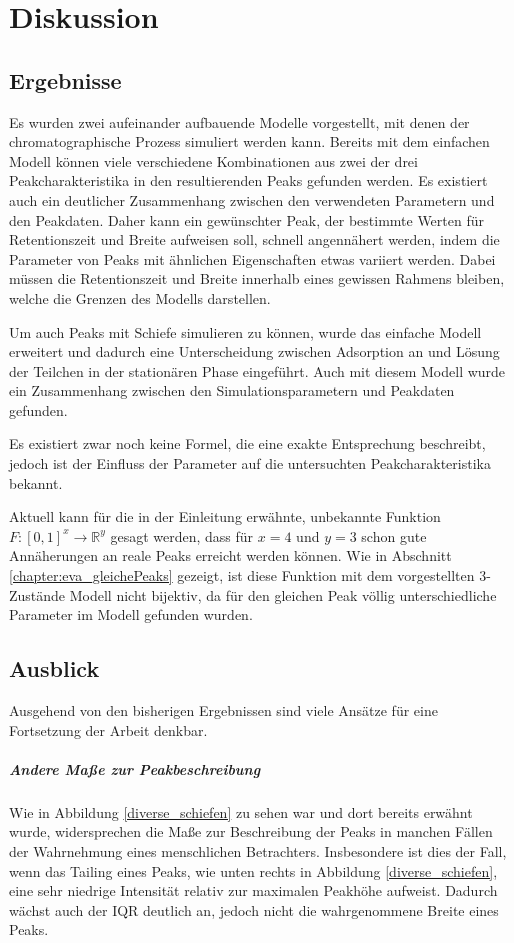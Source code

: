 \chapter{Diskussion}
\label{chapter:dis}

\section{Ergebnisse}
Es wurden zwei aufeinander aufbauende Modelle vorgestellt, mit denen der chromatographische Prozess simuliert werden kann. Bereits mit dem einfachen Modell können viele verschiedene Kombinationen aus zwei der drei Peakcharakteristika in den resultierenden Peaks gefunden werden. Es existiert auch ein deutlicher Zusammenhang zwischen den verwendeten Parametern und den Peakdaten. Daher kann ein gewünschter Peak, der bestimmte Werten für Retentionszeit und Breite aufweisen soll, schnell angennähert werden, indem die Parameter von Peaks mit ähnlichen Eigenschaften etwas variiert werden. Dabei müssen die Retentionszeit und Breite innerhalb eines gewissen Rahmens bleiben, welche die Grenzen des Modells darstellen.

Um auch Peaks mit Schiefe simulieren zu können, wurde das einfache Modell erweitert und dadurch eine Unterscheidung zwischen Adsorption an und Lösung der Teilchen in der stationären Phase eingeführt. Auch mit diesem Modell wurde ein Zusammenhang zwischen den Simulationsparametern und Peakdaten gefunden. 

Es existiert zwar noch keine Formel, die eine exakte Entsprechung beschreibt, jedoch ist der Einfluss der Parameter auf die untersuchten Peakcharakteristika bekannt. 

Aktuell kann für die in der Einleitung erwähnte, unbekannte Funktion  $F: [0,1] ^ x \rightarrow \mathbb{R}^y$ gesagt werden, dass für $x = 4$ und $y = 3$ schon gute Annäherungen an reale Peaks erreicht werden können.
Wie in Abschnitt \ref{chapter:eva_gleichePeaks} gezeigt, ist diese Funktion mit dem vorgestellten 3-Zustände Modell nicht bijektiv, da für den gleichen Peak völlig unterschiedliche Parameter im Modell gefunden wurden.


\section{Ausblick}
Ausgehend von den bisherigen Ergebnissen sind viele Ansätze für eine Fortsetzung der Arbeit denkbar.

\paragraph{Andere Maße zur Peakbeschreibung}
Wie in Abbildung \ref{diverse_schiefen} zu sehen war und dort bereits erwähnt wurde, widersprechen die Maße zur Beschreibung der Peaks in manchen Fällen der Wahrnehmung eines menschlichen Betrachters. Insbesondere ist dies der Fall, wenn das Tailing eines Peaks, wie unten rechts in Abbildung \ref{diverse_schiefen}, eine sehr niedrige Intensität relativ zur maximalen Peakhöhe aufweist. Dadurch wächst auch der IQR deutlich an, jedoch nicht die wahrgenommene Breite eines Peaks.

